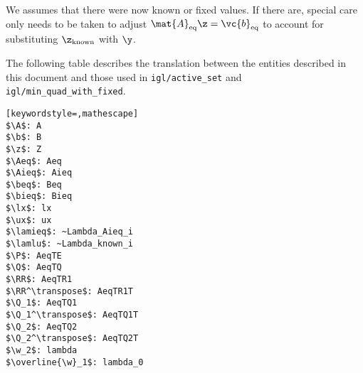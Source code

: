 \documentclass[12pt]{diary}
\renewcommand{\A}{\mat{A}}
\renewcommand{\Q}{\mat{Q}}
\newcommand{\RR}{\mat{R}}
\newcommand{\Aeq}{\mat{A}_\textrm{eq}}
\newcommand{\Aieq}{\mat{A}_\textrm{ieq}}
\newcommand{\beq}{\vc{b}_\textrm{eq}}
\newcommand{\bieq}{\vc{b}_\textrm{ieq}}
\newcommand{\lx}{\Bell}
\newcommand{\ux}{\vc{u}}
\newcommand{\lamieq}{\lambda_\textrm{ieq}}
\newcommand{\lamlu}  {\lambda_\textrm{lu}}
\begin{document}

We assumes that there were now known or fixed values. If there are, special
care only needs to be taken to adjust $\Aeq \z = \beq$ to account for
substituting $\z_\text{known}$ with $\y$. 

\hr
\clearpage

The following table describes the translation between the entities described in
this document and those used in \texttt{igl/active\_set} and
\texttt{igl/min\_quad\_with\_fixed}.
\begin{lstlisting}[keywordstyle=,mathescape]
$\A$: A
$\b$: B
$\z$: Z
$\Aeq$: Aeq
$\Aieq$: Aieq
$\beq$: Beq
$\bieq$: Bieq
$\lx$: lx
$\ux$: ux
$\lamieq$: ~Lambda_Aieq_i
$\lamlu$: ~Lambda_known_i
$\P$: AeqTE
$\Q$: AeqTQ
$\RR$: AeqTR1
$\RR^\transpose$: AeqTR1T
$\Q_1$: AeqTQ1
$\Q_1^\transpose$: AeqTQ1T
$\Q_2$: AeqTQ2
$\Q_2^\transpose$: AeqTQ2T
$\w_2$: lambda
$\overline{\w}_1$: lambda_0
\end{lstlisting}


\end{document}
